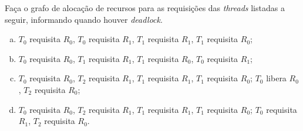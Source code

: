 \def\DEADLOCK{
  Explique também as situações que conduzem a um {\em deadlock} entre
  processos e exemplifique utilizando um grafo de alocação de processos.
}


\question[2] Faça o grafo de alocação de recursos para as requisições
das {\em threads} listadas a seguir, informando quando houver
{\em deadlock}.

\begin{enumerate}[a)]
\item $T_0$ requisita $R_0$, $T_0$ requisita $R_1$,
  $T_1$ requisita $R_1$, $T_1$ requisita $R_0$;

\item $T_0$ requisita $R_0$, $T_1$ requisita $R_1$,
  $T_1$ requisita $R_0$, $T_0$ requisita $R_1$;

\item $T_0$ requisita $R_0$, $T_2$ requisita $R_1$,
  $T_1$ requisita $R_1$, $T_1$ requisita $R_0$;
  $T_0$ libera $R_0$, $T_2$ requisita $R_0$;
  
\item $T_0$ requisita $R_0$, $T_2$ requisita $R_1$,
  $T_1$ requisita $R_1$, $T_1$ requisita $R_0$;
  $T_0$ requisita $R_1$, $T_2$ requisita $R_0$.

\end{enumerate}
